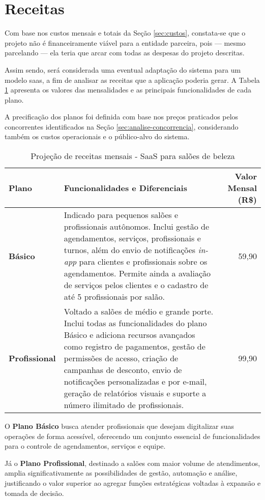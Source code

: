 \section{Receitas}

Com base nos custos mensais e totais da Seção \ref{sec:custos}, constata-se que o projeto não é financeiramente viável para a entidade parceira, pois --- mesmo parcelando --- ela teria que arcar com todas as despesas do projeto descritas.

Assim sendo, será considerada uma eventual adaptação do sistema para um modelo \gls{saas}, a fim de analisar as receitas que a aplicação poderia gerar. A Tabela \ref{tab:receitas-saas} apresenta os valores das mensalidades e as principais funcionalidades de cada plano.

A precificação dos planos foi definida com base nos preços praticados pelos concorrentes identificados na Seção \ref{sec:analise-concorrencia}, considerando também os custos operacionais e o público-alvo do sistema. 

\begin{table}[htbp]
	\centering
	\caption{Projeção de receitas mensais - SaaS para salões de beleza}
	\label{tab:receitas-saas}
	\begin{tabular}{p{3cm}p{7cm}r}
		\toprule
		\textbf{Plano} & \textbf{Funcionalidades e Diferenciais} & \textbf{Valor Mensal (R\$)} \\
		\midrule
		\textbf{Básico} & Indicado para pequenos salões e profissionais autônomos. Inclui gestão de agendamentos, serviços, profissionais e turnos, além do envio de notificações \textit{in-app} para clientes e profissionais sobre os agendamentos. Permite ainda a avaliação de serviços pelos clientes e o cadastro de até 5 profissionais por salão. & 59,90 \\
		\addlinespace
		\textbf{Profissional} & Voltado a salões de médio e grande porte. Inclui todas as funcionalidades do plano Básico e adiciona recursos avançados como registro de pagamentos, gestão de permissões de acesso, criação de campanhas de desconto, envio de notificações personalizadas e por e-mail, geração de relatórios visuais e suporte a número ilimitado de profissionais. & 99,90 \\
		\bottomrule
	\end{tabular}
\end{table}

O \textbf{Plano Básico} busca atender profissionais que desejam digitalizar suas operações de forma acessível, oferecendo um conjunto essencial de funcionalidades para o controle de agendamentos, serviços e equipe. 

Já o \textbf{Plano Profissional}, destinado a salões com maior volume de atendimentos, amplia significativamente as possibilidades de gestão, automação e análise, justificando o valor superior ao agregar funções estratégicas voltadas à expansão e tomada de decisão.
